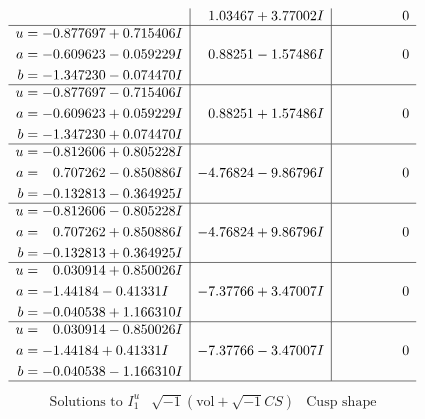 \documentclass[1p]{elsarticle_modified}
\theoremstyle{definition}
\newcommand{\I}{\sqrt{-1}}
\begin{document}
$$\begin{array}{c|c|c}
 & \phantom{-}1.03467 + 3.77002 I & \phantom{-0.000000 } 0 \\ \hline\begin{aligned}
u &= -0.877697 + 0.715406 I \\
a &= -0.609623 - 0.059229 I \\
b &= -1.347230 - 0.074470 I\end{aligned}
 & \phantom{-}0.88251 - 1.57486 I & \phantom{-0.000000 } 0 \\ \hline\begin{aligned}
u &= -0.877697 - 0.715406 I \\
a &= -0.609623 + 0.059229 I \\
b &= -1.347230 + 0.074470 I\end{aligned}
 & \phantom{-}0.88251 + 1.57486 I & \phantom{-0.000000 } 0 \\ \hline\begin{aligned}
u &= -0.812606 + 0.805228 I \\
a &= \phantom{-}0.707262 - 0.850886 I \\
b &= -0.132813 - 0.364925 I\end{aligned}
 & -4.76824 - 9.86796 I & \phantom{-0.000000 } 0 \\ \hline\begin{aligned}
u &= -0.812606 - 0.805228 I \\
a &= \phantom{-}0.707262 + 0.850886 I \\
b &= -0.132813 + 0.364925 I\end{aligned}
 & -4.76824 + 9.86796 I & \phantom{-0.000000 } 0 \\ \hline\begin{aligned}
u &= \phantom{-}0.030914 + 0.850026 I \\
a &= -1.44184 - 0.41331 I \\
b &= -0.040538 + 1.166310 I\end{aligned}
 & -7.37766 + 3.47007 I & \phantom{-0.000000 } 0 \\ \hline\begin{aligned}
u &= \phantom{-}0.030914 - 0.850026 I \\
a &= -1.44184 + 0.41331 I \\
b &= -0.040538 - 1.166310 I\end{aligned}
 & -7.37766 - 3.47007 I & \phantom{-0.000000 } 0\\
 \hline 
 \end{array}$$\newpage$$\begin{array}{c|c|c}  
\text{Solutions to }I^u_{1}& \I (\text{vol} + \sqrt{-1}CS) & \text{Cusp shape}\\

\end{array}$$
\end{document}
